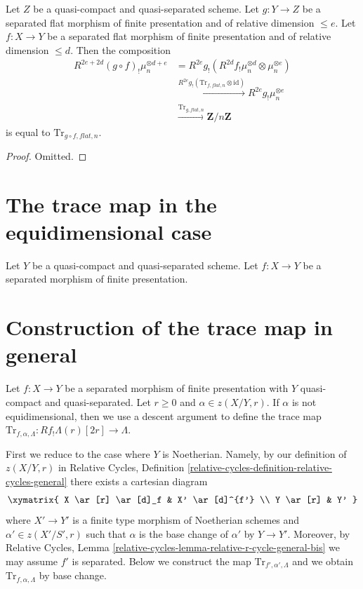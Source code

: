 \begin{lemma}
\label{lemma-composition-flat-trace}
Let $Z$ be a quasi-compact and quasi-separated scheme.
Let $g : Y \to Z$ be a separated flat morphism of finite presentation
and of relative dimension $\leq e$.
Let $f : X \to Y$ be a separated flat morphism of finite presentation
and of relative dimension $\leq d$.
Then the composition
\begin{align*}
R^{2e + 2d}(g \circ f)_!\mu_n^{\otimes d + e}
& =
R^{2e}g_!\left(R^{2d}f_!\mu_n^{\otimes d} \otimes \mu_n^{\otimes e}\right) \\
& \xrightarrow{R^{2e}g_!(\text{Tr}_{f, \mathit{flat}, n} \otimes \text{id})}
R^{2e}g_!\mu_n^{\otimes e} \\
& \xrightarrow{\text{Tr}_{g, \mathit{flat}, n}}
\mathbf{Z}/n\mathbf{Z}
\end{align*}
is equal to $\text{Tr}_{g \circ f, \mathit{flat}, n}$.
\end{lemma}

\begin{proof}
Omitted.
\end{proof}










\section{The trace map in the equidimensional case}
\label{section-construction-equidimensional}

\noindent
Let $Y$ be a quasi-compact and quasi-separated scheme.
Let $f : X \to Y$ be a separated morphism of finite presentation.






\section{Construction of the trace map in general}
\label{section-construction-general}

\noindent
Let $f : X \to Y$ be a separated morphism of finite presentation
with $Y$ quasi-compact and quasi-separated. Let $r \geq 0$
and $\alpha \in z(X/Y, r)$. If $\alpha$ is not equidimensional, then
we use a descent argument to define the trace map
$\text{Tr}_{f, \alpha, \Lambda} : Rf_!\Lambda(r)[2r] \to \Lambda$.

\medskip\noindent
First we reduce to the case where $Y$ is Noetherian. Namely, by
our definition of $z(X/Y, r)$ in
Relative Cycles, Definition
\ref{relative-cycles-definition-relative-cycles-general}
there exists a cartesian diagram
$$
\xymatrix{
X \ar[r] \ar[d]_f & X' \ar[d]^{f'} \\
Y \ar[r] & Y'
}
$$
where $X' \to Y'$ is a finite type morphism of Noetherian schemes
and $\alpha' \in z(X'/S', r)$ such that $\alpha$ is the base change
of $\alpha'$ by $Y \to Y'$. Moreover, by Relative Cycles, Lemma
\ref{relative-cycles-lemma-relative-r-cycle-general-bis}
we may assume $f'$ is separated.
Below we construct the map $\text{Tr}_{f', \alpha', \Lambda}$
and we obtain $\text{Tr}_{f, \alpha, \Lambda}$ by base change.

